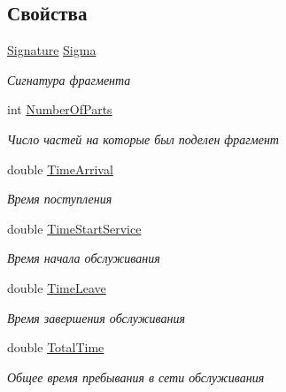 \subsection*{Свойства}
\begin{DoxyCompactItemize}
\item 
\hyperlink{class_network_simulator_1_1_signature}{Signature} \hyperlink{class_network_simulator_1_1_fragment_a4a04d76e80868fe6ea72fc453d946218}{Sigma}
\begin{DoxyCompactList}\small\item\em Сигнатура фрагмента \end{DoxyCompactList}\item 
int \hyperlink{class_network_simulator_1_1_fragment_a2c78012857282ae0729edba332f936ee}{Number\+Of\+Parts}
\begin{DoxyCompactList}\small\item\em Число частей на которые был поделен фрагмент \end{DoxyCompactList}\item 
double \hyperlink{class_network_simulator_1_1_fragment_a55a8a96eed9ca0a8bcdad41ac0710e95}{Time\+Arrival}
\begin{DoxyCompactList}\small\item\em Время поступления \end{DoxyCompactList}\item 
double \hyperlink{class_network_simulator_1_1_fragment_a5a585d4c4fecc4f03d5fb136cc8c8f5e}{Time\+Start\+Service}
\begin{DoxyCompactList}\small\item\em Время начала обслуживания \end{DoxyCompactList}\item 
double \hyperlink{class_network_simulator_1_1_fragment_ab4ea6557da38174fdc08f73e39d7ff4c}{Time\+Leave}
\begin{DoxyCompactList}\small\item\em Время завершения обслуживания \end{DoxyCompactList}\item 
double \hyperlink{class_network_simulator_1_1_fragment_a93384e51e479637c537049d881ac9686}{Total\+Time}
\begin{DoxyCompactList}\small\item\em Общее время пребывания в сети обслуживания \end{DoxyCompactList}\end{DoxyCompactItemize}


